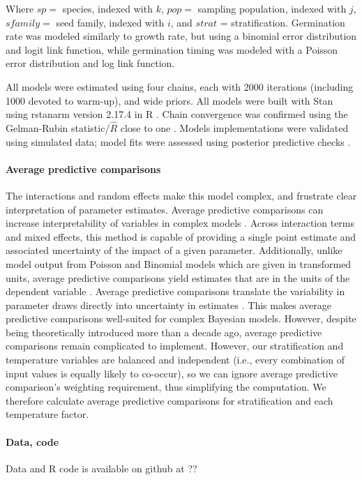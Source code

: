 \documentclass[12pt]{article}\usepackage[]{graphicx}\usepackage[]{color}
\begin{document}
	 Where $sp = $ species, indexed with $k$, $pop =$ sampling population, indexed with $j$, $sfamily =$ seed family, indexed with $i$, and $strat$ = stratification. Germination rate was modeled similarly to growth rate, but using a binomial error distribution and logit link function, while germination timing was modeled with a Poisson error distribution and log link function. 
	 	
	All models were estimated using four chains, each with 2000 iterations (including 1000 devoted to warm-up), and wide priors. All models were built with Stan \parencite{Carpenter2017} using rstanarm version 2.17.4 \parencite{Goodrich2018} in R \parencite{Team2015}. Chain convergence was confirmed using the Gelman-Rubin statistic/$\hat{R}$ close to one \parencite{Gelman1992}. Models implementations were validated using simulated data; model fits were assessed using posterior predictive checks \parencite{Gelman2004}.  
	
	\paragraph{Average predictive comparisons} The interactions and random effects make this model complex, and frustrate clear interpretation of parameter estimates. Average predictive comparisons can increase interpretability of variables in complex models \parencite{Gelman2007}. Across interaction terms and mixed effects, this method is capable of providing a single point estimate and associated uncertainty of the impact of a given parameter. Additionally, unlike model output from Poisson and Binomial models which are given in transformed units, average predictive comparisons yield estimates that are in the units of the dependent variable \parencite{Gelman2007}. Average predictive comparisons translate the variability in parameter draws directly into uncertainty in estimates \parencite{Gelman2007}. This makes average predictive comparisons well-suited for complex Bayesian models. However, despite being theoretically introduced more than a decade ago, average predictive comparisons remain complicated to implement. However, our stratification and temperature variables are balanced and independent  (i.e., every combination of input values is equally likely to co-occur), so we can ignore average predictive comparison's weighting requirement, thus simplifying the computation. We therefore calculate average predictive comparisons for stratification and each temperature factor.
	
	\paragraph{Data, code} 
	Data and R code is available on github at ??
\end{document}
